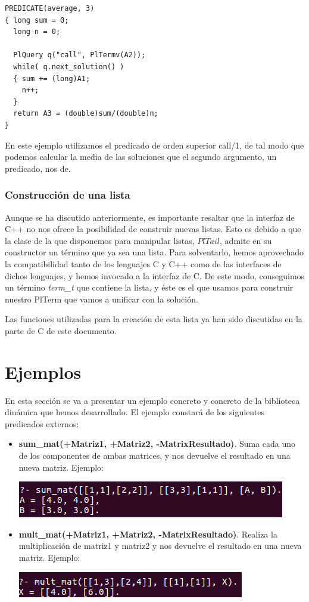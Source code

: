 \documentclass[a4paper,12pt]{article}
\begin{document}
\begin{lstlisting}[style=C++]
PREDICATE(average, 3)
{ long sum = 0;
  long n = 0;

  PlQuery q("call", PlTermv(A2));
  while( q.next_solution() )
  { sum += (long)A1;
    n++;
  }
  return A3 = (double)sum/(double)n;
}
\end{lstlisting}

En este ejemplo utilizamos el predicado de orden superior call/1, de tal modo que podemos calcular la media de las soluciones que el segundo argumento, un predicado, nos de.

\subsubsection{Construcción de una lista}

Aunque se ha discutido anteriormente, es importante resaltar que la interfaz de C++ no nos ofrece la posibilidad de construir nuevas listas. Esto es debido a que la clase de la que disponemos para manipular listas, $PlTail$, admite en su constructor un término que ya sea una lista. Para solventarlo, hemos aprovechado la compatibilidad tanto de los lenguajes C y C++ como de las interfaces de dichos lenguajes, y hemos invocado a la interfaz de C. De este modo, conseguimos un término \textit{term\_t} que contiene la lista, y éste es el que usamos para construir nuestro PlTerm que vamos a unificar con la solución. 

Las funciones utilizadas para la creación de esta lista ya han sido discutidas en la parte de C de este documento.

\section{Ejemplos}

En esta sección se va a presentar un ejemplo concreto y concreto de la biblioteca dinámica que hemos desarrollado. El ejemplo constará de los siguientes predicados externos:

\begin{itemize}
\item \textbf{sum\_mat(+Matriz1, +Matriz2, -MatrixResultado)}. Suma cada uno de los componentes de ambas matrices, y nos devuelve el resultado en una nueva matriz. Ejemplo:

\includegraphics[scale=0.6]{EjemploSuma.jpeg}
\item \textbf{mult\_mat(+Matriz1, +Matriz2, -MatrixResultado)}. Realiza la multiplicación de matriz1 y matriz2 y nos devuelve el resultado en una nueva matriz. Ejemplo:

\includegraphics[scale=0.6]{EjemploMult.jpeg}
\end{itemize}
\end{document}
